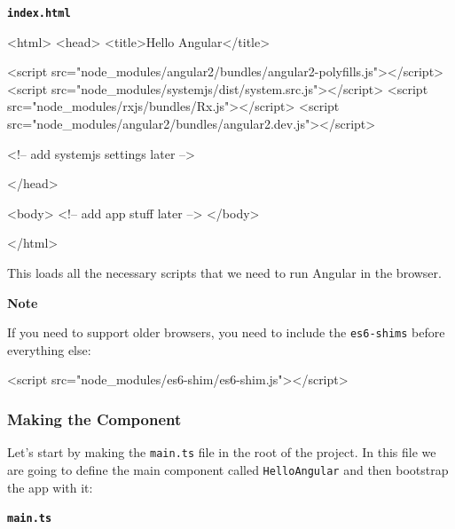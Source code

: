 \documentclass[12pt,]{article}
\newenvironment{Shaded}{}{}
\newcommand{\KeywordTok}[1]{\textcolor[rgb]{0.00,0.00,1.00}{{#1}}}
\newcommand{\StringTok}[1]{\textcolor[rgb]{0.00,0.50,0.50}{{#1}}}
\newcommand{\CommentTok}[1]{\textcolor[rgb]{0.00,0.50,0.00}{{#1}}}
\newcommand{\OtherTok}[1]{\textcolor[rgb]{1.00,0.25,0.00}{{#1}}}
\newcommand{\NormalTok}[1]{{#1}}
\begin{document}
\textbf{\texttt{index.html}}

\begin{Shaded}
\begin{Highlighting}[numbers=left,,]
\KeywordTok{<html>}
\KeywordTok{<head>}
  \KeywordTok{<title>}\NormalTok{Hello Angular}\KeywordTok{</title>}

  \KeywordTok{<script}\OtherTok{ src=}\StringTok{"node_modules/angular2/bundles/angular2-polyfills.js"}\KeywordTok{></script>}
  \KeywordTok{<script}\OtherTok{ src=}\StringTok{"node_modules/systemjs/dist/system.src.js"}\KeywordTok{></script>}
  \KeywordTok{<script}\OtherTok{ src=}\StringTok{"node_modules/rxjs/bundles/Rx.js"}\KeywordTok{></script>}
  \KeywordTok{<script}\OtherTok{ src=}\StringTok{"node_modules/angular2/bundles/angular2.dev.js"}\KeywordTok{></script>}

  \CommentTok{<!-- add systemjs settings later -->}

\KeywordTok{</head>}

\KeywordTok{<body>}
  \CommentTok{<!-- add app stuff later -->}
\KeywordTok{</body>}

\KeywordTok{</html>}
\end{Highlighting}
\end{Shaded}

This loads all the necessary scripts that we need to run Angular in the
browser.

\textbf{Note}

If you need to support older browsers, you need to include the
\texttt{es6-shims} before everything else:

\begin{Shaded}
\begin{Highlighting}[numbers=left,,]
\KeywordTok{<script}\OtherTok{ src=}\StringTok{"node_modules/es6-shim/es6-shim.js"}\KeywordTok{></script>}
\end{Highlighting}
\end{Shaded}

\subsubsection{Making the Component}\label{making-the-component}

Let's start by making the \texttt{main.ts} file in the root of the
project. In this file we are going to define the main component called
\texttt{HelloAngular} and then bootstrap the app with it:

\textbf{\texttt{main.ts}}
\end{document}
